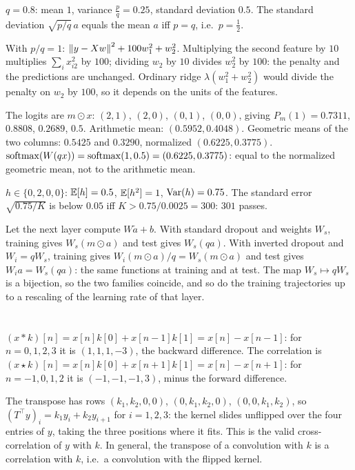 $q = 0.8$: mean $1$, variance $\frac pq = 0.25$, standard deviation $0.5$. The standard deviation $\sqrt{p/q}\,a$ equals the mean
$a$ iff $p = q$, i.e.\ $p = \frac12$.

With $p/q = 1$: $\left\|y - Xw\right\|^2 + 100w_1^2 + w_2^2$. Multiplying the second feature by $10$ multiplies $\sum_ix_{i2}^2$ by $100$; dividing
$w_2$ by $10$ divides $w_2^2$ by $100$: the penalty and the predictions are unchanged. Ordinary ridge $\lambda(w_1^2 + w_2^2)$
would divide the penalty on $w_2$ by $100$, so it depends on the units of the features.

The logits are $m\odot x$: $(2,1)$, $(2,0)$, $(0,1)$, $(0,0)$, giving $P_m(1) = 0.7311$, $0.8808$, $0.2689$, $0.5$. Arithmetic mean:
$(0.5952, 0.4048)$. Geometric means of the two columns: $0.5425$ and $0.3290$, normalized $(0.6225, 0.3775)$.
$\operatorname{softmax}(W(qx)) = \operatorname{softmax}(1, 0.5) = (0.6225, 0.3775)$: equal to the normalized geometric mean, not to the
arithmetic mean.

$h\in\{0,2,0,0\}$: $\mathbb{E}[h] = 0.5$, $\mathbb{E}[h^2] = 1$, $\operatorname{Var}(h) = 0.75$. The standard error $\sqrt{0.75/K}$ is below $0.05$ iff $K>0.75/0.0025 = 300$:
$301$ passes.

Let the next layer compute $W\tilde a + b$. With standard dropout and weights $W_s$, training gives $W_s(m\odot a)$ and
test gives $W_s(qa)$. With inverted dropout and $W_i = qW_s$, training gives $W_i(m\odot a)/q = W_s(m\odot a)$ and test
gives $W_ia = W_s(qa)$: the same functions at training and at test. The map $W_s\mapsto qW_s$ is a bijection, so
the two families coincide, and so do the training trajectories up to a rescaling of the
learning rate of that layer.

\section{}

$(x * k)[n] = x[n]k[0] + x[n - 1]k[1] = x[n] - x[n - 1]$: for $n = 0,1,2,3$ it is $(1, 1, 1, -3)$, the backward difference. The
correlation is $(x\star k)[n] = x[n]k[0] + x[n + 1]k[1] = x[n] - x[n + 1]$: for $n = -1,0,1,2$ it is $(-1, -1, -1, 3)$, minus the forward
difference.

The transpose has rows $(k_1, k_2, 0, 0)$, $(0, k_1, k_2, 0)$, $(0, 0, k_1, k_2)$, so $(T^\top y)_i = k_1y_i + k_2y_{i+1}$ for $i = 1,2,3$: the kernel slides
unflipped over the four entries of $y$, taking the three positions where it fits. This is the valid
cross-correlation of $y$ with $k$. In general, the transpose of a convolution with $k$ is a correlation
with $k$, i.e.\ a convolution with the flipped kernel.

